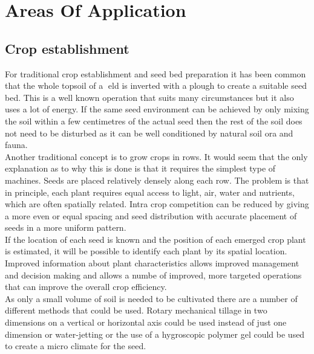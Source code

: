 \documentclass{report}
\begin{document}
\section{Areas Of Application}
\subsection{Crop establishment}
For traditional crop establishment and seed bed preparation it has been common that the whole topsoil of a
eld is inverted with a plough to create a suitable seed bed. This is a well known operation that suits many
circumstances but it also uses a lot of energy.
If the same seed environment can be achieved by only mixing the soil within a few centimetres of the actual
seed then the rest of the soil does not need to be disturbed as it can be well conditioned by natural soil 
ora
and fauna.\\
Another traditional concept is to grow crops in rows. It would seem that the only explanation as to why this
is done is that it requires the simplest type of machines. Seeds are placed relatively densely along each row.
The problem is that in principle, each plant requires equal access to light, air, water and nutrients, which
are often spatially related. Intra crop competition can be reduced by giving a more even or equal spacing
and seed distribution with accurate placement of seeds in a more uniform pattern.\\
If the location of each seed is known and the position of each emerged crop plant is estimated, it will be possible to identify each plant by its spatial location. Improved information about plant characteristics allows improved management and decision making and allows a numbe of improved, more targeted operations that can improve the overall crop efficiency.\\
As only a small volume of soil is needed to be cultivated there are a number of different methods that could be used. Rotary mechanical tillage in two dimensions on a vertical or horizontal axis could be used instead of just one dimension or water-jetting or the use of a hygroscopic polymer gel could be used to create a micro climate for the seed.
\end{document}
